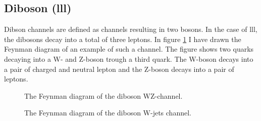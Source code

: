 \subsection{Diboson (lll)}
Dibson channels are defined as channels resulting in two bosons. In the case of lll, the dibosons
decay into a total of three leptons. In figure \ref{fig:wz} I have drawn the Feynman diagram of an 
example of such a channel. The figure shows two quarks decaying into a W- and Z-boson trough a 
third quark. The W-boson decays into a pair of charged and neutral lepton and the Z-boson decays 
into a pair of leptons. 
\begin{figure}
    \centering
    \caption{The Feynman diagram of the diboson WZ-channel.}
    \label{fig:wz}
\end{figure}
\begin{figure}
    \centering
    \caption{The Feynman diagram of the diboson W-jets channel.}
    \label{fig:w_pjets}
\end{figure}


